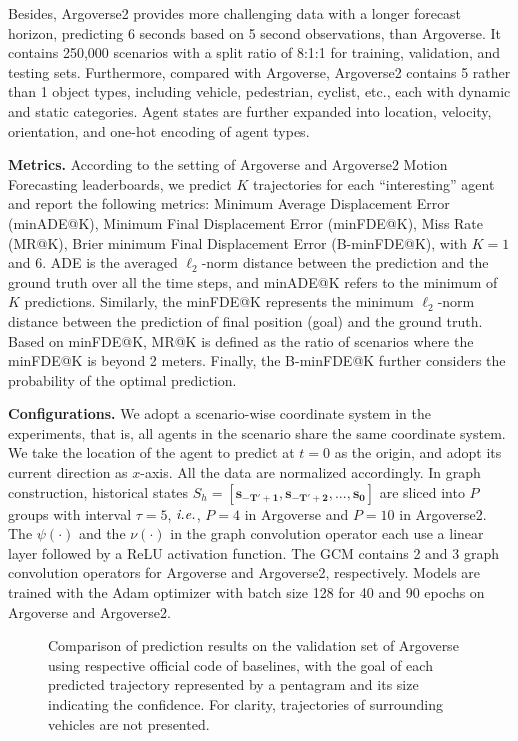 \documentclass[letterpaper, 10 pt, conference]{ieeeconf}
\begin{document}
Besides, Argoverse2 \cite{wilson2021argoverse} provides more challenging data with a longer forecast horizon, predicting 6 seconds based on 5 second observations, than Argoverse. It contains 250,000 scenarios with a split ratio of 8:1:1 for training, validation, and testing sets. Furthermore, compared with Argoverse, Argoverse2 contains 5 rather than 1 object types, including vehicle, pedestrian, cyclist, etc., each with dynamic and static categories. Agent states are further expanded into location, velocity, orientation, and one-hot encoding of agent types.

\textbf{Metrics.} According to the setting of Argoverse and Argoverse2 Motion Forecasting leaderboards, we predict $K$ trajectories for each ``interesting'' agent and report the following metrics: Minimum Average Displacement Error (minADE@K), Minimum Final Displacement Error (minFDE@K), Miss Rate (MR@K), Brier minimum Final Displacement Error (B-minFDE@K), with $K=1$ and $6$. ADE is the averaged $\ell_2$-norm distance between the prediction and the ground truth over all the time steps, and minADE@K refers to the minimum  of $K$ predictions.  Similarly, the minFDE@K represents the minimum $\ell_2$-norm distance between the prediction  of final position (goal) and the  ground truth. Based on minFDE@K, MR@K is defined as the ratio of scenarios where the minFDE@K is beyond 2 meters. Finally, the B-minFDE@K further considers the probability of the optimal prediction. 


\textbf{Configurations.}
We adopt a scenario-wise coordinate system in the experiments, that is, all agents in the scenario share the same coordinate system.   We take the location of the agent to predict at $t=0$ as the origin, and adopt its current direction as $x$-axis. All the data are normalized accordingly. In graph construction, historical states $S_h= \left[ \bm{s_{-T'+1}},\bm{s_{-T'+2}},...,\bm{s_{0}} \right]$ are sliced into $P$ groups with interval $\tau=5$, $\emph{i.e.}$, $P=4$ in Argoverse and $P=10$ in Argoverse2. The $\psi(\cdot)$ and the $\nu(\cdot)$ in the graph convolution operator each use a linear layer followed by a ReLU activation function.
The GCM contains 2 and 3 graph convolution operators for Argoverse and Argoverse2, respectively. 
Models are trained with the Adam \cite{kingma2014adam} optimizer with batch size 128 for 40 and 90 epochs on Argoverse and Argoverse2.

\begin{figure*}[tp]
\renewcommand{\baselinestretch}{1.0}
\renewcommand{\abovecaptionskip}{0pt}
\vskip 0.2in
 \caption{Comparison of prediction results on the validation set of Argoverse using respective official code of baselines, with the goal of each predicted trajectory  represented by a pentagram and its size indicating the confidence.
 For clarity, trajectories of surrounding vehicles are not presented. } \label{fig.comp}
\end{figure*}
\end{document}
